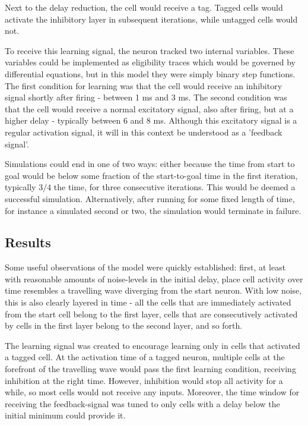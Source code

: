 \documentclass{article}
\begin{document}
    Next to the delay reduction, the cell would receive a tag. Tagged cells would activate the inhibitory layer in subsequent iterations, while untagged cells would not.

    To receive this learning signal, the neuron tracked two internal variables. These variables could be implemented as eligibility traces which would be governed by differential equations, but in this model they were simply binary step functions. The first condition for learning was that the cell would receive an inhibitory signal shortly after firing - between 1 ms and 3 ms. The second condition was that the cell would receive a normal excitatory signal, also after firing, but at a higher delay - typically between 6 and 8 ms. Although this excitatory signal is a regular activation signal, it will in this context be understood as a 'feedback signal'.

    Simulations could end in one of two ways: either because the time from start to goal would be below some fraction of the start-to-goal time in the first iteration, typically \(3/4\) the time, for three consecutive iterations. This would be deemed a successful simulation. Alternatively, after running for some fixed length of time, for instance a simulated second or two, the simulation would terminate in failure.

    \subsection{Results}
    Some useful observations of the model were quickly established: first, at least with reasonable amounts of noise-levels in the initial delay, place cell activity over time resembles a travelling wave diverging from the start neuron. With low noise, this is also clearly layered in time - all the cells that are immediately activated from the start cell belong to the first layer, cells that are consecutively activated by cells in the first layer belong to the second layer, and so forth.

    The learning signal was created to encourage learning only in cells that activated a tagged cell. At the activation time of a tagged neuron, multiple cells at the forefront of the travelling wave would pass the first learning condition, receiving inhibition at the right time. However, inhibition would stop all activity for a while, so most cells would not receive any inputs. Moreover, the time window for receiving the feedback-signal was tuned to only cells with a delay below the initial minimum could provide it.
\end{document}
